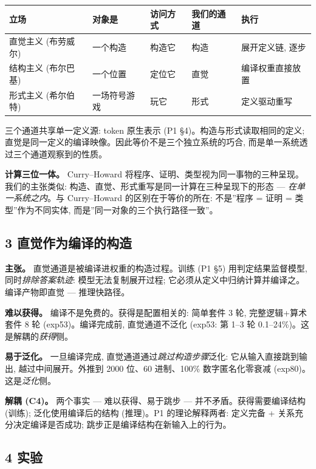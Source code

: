 \documentclass[
]{article}
\begin{document}
\begin{longtable}[]{@{}lllll@{}}
\toprule\noalign{}
立场 & 对象是 & 访问方式 & 我们的通道 & 执行 \\
\midrule\noalign{}
\endhead
\bottomrule\noalign{}
\endlastfoot
直觉主义 (布劳威尔) & 一个构造 & 构造它 & 构造 & 展开定义链, 逐步 \\
结构主义 (布尔巴基) & 一个位置 & 定位它 & 直觉 & 编译权重直接放置 \\
形式主义 (希尔伯特) & 一场符号游戏 & 玩它 & 形式 & 定义驱动重写 \\
\end{longtable}

三个通道共享单一定义源: token 原生表示 (P1
§4)。构造与形式读取相同的定义;
直觉是同一定义的编译映像。因此等价不是三个独立系统的巧合,
而是单一系统透过三个通道观察到的性质。

\textbf{计算三位一体。} Curry--Howard
将程序、证明、类型视为同一事物的三种呈现。我们的主张类似:
构造、直觉、形式重写是同一计算在三种呈现下的形态 ---
\emph{在单一系统之内}。与 Curry--Howard 的区别在于等价的所在: 不是''程序
= 证明 = 类型''作为不同实体, 而是''同一对象的三个执行路径一致''。

\subsection{3
直觉作为编译的构造}\label{ux76f4ux89c9ux4f5cux4e3aux7f16ux8bd1ux7684ux6784ux9020}

\textbf{主张。} 直觉通道是被编译进权重的构造过程。训练 (P1 §5)
用判定结果监督模型, 同时\emph{排除答案轨迹}: 模型无法复制展开过程;
它必须从定义中归纳计算并编译之。编译产物即直觉 --- 推理快路径。

\textbf{难以获得。} 编译不是免费的。获得是配置相关的: 简单套件 3 轮,
完整逻辑+算术套件 8 轮 (exp53)。编译完成前, 直觉通道不泛化 (exp53: 第
1--3 轮 0.1--24\%)。这是解耦的\emph{获得}侧。

\textbf{易于泛化。} 一旦编译完成, 直觉通道通过\emph{跳过构造步骤}泛化:
它从输入直接跳到输出, 越过中间展开。外推到 2000 位、60 进制、100\%
数字匿名化零衰减 (exp80)。这是\emph{泛化}侧。

\textbf{解耦 (C4)。} 两个事实 --- 难以获得、易于跳步 ---
并不矛盾。获得需要编译结构 (训练); 泛化使用编译后的结构 (推理)。P1
的理论解释两者: 定义完备 + 关系充分决定编译是否成功;
跳步正是编译结构在新输入上的行为。

\subsection{4 实验}\label{ux5b9eux9a8c}
\end{document}
